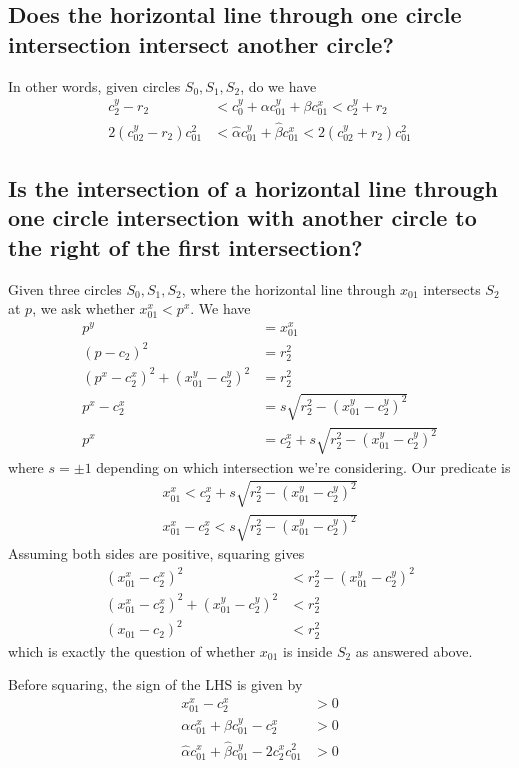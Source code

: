\documentclass[11pt]{article}
\begin{document}
\subsection{Does the horizontal line through one circle intersection intersect another circle?}

In other words, given circles $S_0, S_1, S_2$, do we have
\begin{align*}
c_2^y - r_2 &< c_0^y + \alpha c_{01}^y + \beta c_{01}^x < c_2^y + r_2 \\
2 (c_{02}^y - r_2) c_{01}^2 &< \hat{\alpha} c_{01}^y + \hat{\beta} c_{01}^x < 2 (c_{02}^y + r_2) c_{01}^2
\end{align*}

\subsection{Is the intersection of a horizontal line through one circle intersection with another circle to the right of the first intersection?}

Given three circles $S_0, S_1, S_2$, where the horizontal line through $x_{01}$ intersects $S_2$ at $p$, we ask whether $x_{01}^x < p^x$.  We have
\begin{align*}
p^y &= x_{01}^x \\
(p - c_2)^2 &= r_2^2 \\
(p^x - c_2^x)^2 + (x_{01}^y - c_2^y)^2 &= r_2^2 \\
p^x - c_2^x &= s \sqrt{r_2^2 - (x_{01}^y - c_2^y)^2} \\
p^x &= c_2^x + s \sqrt{r_2^2 - (x_{01}^y - c_2^y)^2}
\end{align*}
where $s = \pm 1$ depending on which intersection we're considering.  Our predicate is
\begin{align*}
x_{01}^x < c_2^x + s \sqrt{r_2^2 - (x_{01}^y - c_2^y)^2} \\
x_{01}^x - c_2^x < s \sqrt{r_2^2 - (x_{01}^y - c_2^y)^2}
\end{align*}
Assuming both sides are positive, squaring gives
\begin{align*}
(x_{01}^x - c_2^x)^2 &< r_2^2 - (x_{01}^y - c_2^y)^2 \\
(x_{01}^x - c_2^x)^2 + (x_{01}^y - c_2^y)^2 &< r_2^2 \\
(x_{01} - c_2)^2 &< r_2^2
\end{align*}
which is exactly the question of whether $x_{01}$ is inside $S_2$ as answered above.

Before squaring, the sign of the LHS is given by
\begin{align*}
x_{01}^x - c_2^x &> 0 \\
\alpha c_{01}^x + \beta c_{01}^y - c_2^x &> 0 \\
\hat{\alpha} c_{01}^x + \hat{\beta} c_{01}^y - 2 c_2^x c_{01}^2 &> 0
\end{align*}
\end{document}
